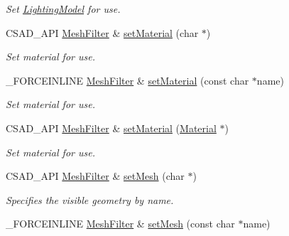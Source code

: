 \begin{DoxyCompactItemize}
\begin{DoxyCompactList}\small\item\em Set \hyperlink{classcsad_1_1_lighting_model}{Lighting\-Model} for use. \end{DoxyCompactList}\item 
\hypertarget{classcsad_1_1_mesh_filter_a2f943cf999049ec61cf5bdb6ba73aec8}{C\-S\-A\-D\-\_\-\-A\-P\-I \hyperlink{classcsad_1_1_mesh_filter}{Mesh\-Filter} \& \hyperlink{classcsad_1_1_mesh_filter_a2f943cf999049ec61cf5bdb6ba73aec8}{set\-Material} (char $\ast$)}\label{classcsad_1_1_mesh_filter_a2f943cf999049ec61cf5bdb6ba73aec8}

\begin{DoxyCompactList}\small\item\em Set material for use. \end{DoxyCompactList}\item 
\hypertarget{classcsad_1_1_mesh_filter_a0d57d5b460bde103167907662e651153}{\-\_\-\-F\-O\-R\-C\-E\-I\-N\-L\-I\-N\-E \hyperlink{classcsad_1_1_mesh_filter}{Mesh\-Filter} \& \hyperlink{classcsad_1_1_mesh_filter_a0d57d5b460bde103167907662e651153}{set\-Material} (const char $\ast$name)}\label{classcsad_1_1_mesh_filter_a0d57d5b460bde103167907662e651153}

\begin{DoxyCompactList}\small\item\em Set material for use. \end{DoxyCompactList}\item 
\hypertarget{classcsad_1_1_mesh_filter_ab77f373f91f775a46160aa9d03bf56a5}{C\-S\-A\-D\-\_\-\-A\-P\-I \hyperlink{classcsad_1_1_mesh_filter}{Mesh\-Filter} \& \hyperlink{classcsad_1_1_mesh_filter_ab77f373f91f775a46160aa9d03bf56a5}{set\-Material} (\hyperlink{classcsad_1_1_material}{Material} $\ast$)}\label{classcsad_1_1_mesh_filter_ab77f373f91f775a46160aa9d03bf56a5}

\begin{DoxyCompactList}\small\item\em Set material for use. \end{DoxyCompactList}\item 
\hypertarget{classcsad_1_1_mesh_filter_aba4e761c4a223bf1f01d92e4106bdeb7}{C\-S\-A\-D\-\_\-\-A\-P\-I \hyperlink{classcsad_1_1_mesh_filter}{Mesh\-Filter} \& \hyperlink{classcsad_1_1_mesh_filter_aba4e761c4a223bf1f01d92e4106bdeb7}{set\-Mesh} (char $\ast$)}\label{classcsad_1_1_mesh_filter_aba4e761c4a223bf1f01d92e4106bdeb7}

\begin{DoxyCompactList}\small\item\em Specifies the visible geometry by name. \end{DoxyCompactList}\item 
\hypertarget{classcsad_1_1_mesh_filter_ae31e1bfe9ee6227689acb6d20f241505}{\-\_\-\-F\-O\-R\-C\-E\-I\-N\-L\-I\-N\-E \hyperlink{classcsad_1_1_mesh_filter}{Mesh\-Filter} \& \hyperlink{classcsad_1_1_mesh_filter_ae31e1bfe9ee6227689acb6d20f241505}{set\-Mesh} (const char $\ast$name)}\label{classcsad_1_1_mesh_filter_ae31e1bfe9ee6227689acb6d20f241505}


\end{DoxyCompactItemize}
